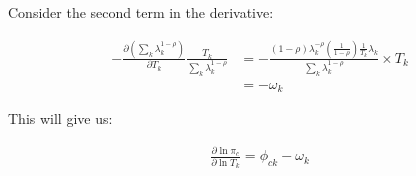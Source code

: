 \documentclass[10pt]{article}
\begin{document}
Consider the second term in the derivative:

\begin{align*}
    - \frac{\partial \left( \sum_{k}^{} \lambda_k^{1 - \rho} \right)}{\partial T_k} \frac{T_k}{\sum_{k}^{} \lambda_k^{1 - \rho}} & = - \frac{(1 - \rho) \lambda_k^{- \rho} \left( \frac{1}{1 - \rho} \right) \frac{1}{T_k} \lambda_k}{\sum_{k}^{} \lambda_k^{1 - \rho}} \times T_k \\
                                                                                                                                 & = - \omega_k
\end{align*}

This will give us:

\begin{align*}
    \frac{\partial \ln \pi_c}{\partial \ln T_k} = \phi_{ck} - \omega_k
\end{align*}
\end{document}
